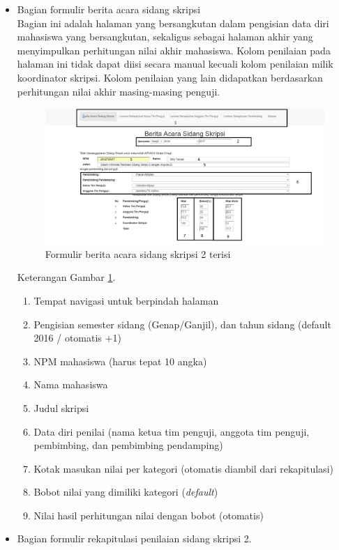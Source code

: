 	\begin{itemize}
		\item Bagian formulir berita acara sidang skripsi\\
		Bagian ini adalah halaman yang bersangkutan dalam pengisian data diri mahasiswa yang bersangkutan, sekaligus sebagai halaman akhir yang menyimpulkan perhitungan nilai akhir mahasiswa. Kolom penilaian pada halaman ini tidak dapat diisi secara manual kecuali kolom penilaian milik koordinator skripsi. Kolom penilaian yang lain didapatkan berdasarkan perhitungan nilai akhir masing-masing penguji.
		\begin{figure}[H]
			\centering
			\includegraphics[scale=0.4]{Gambar/beritaacaraisi}
			\caption{Formulir berita acara sidang skripsi 2 terisi}
			\label{fig:beritaisi}
		\end{figure}
	Keterangan Gambar \ref{fig:beritaisi}.
		\begin{enumerate}
			\item Tempat navigasi untuk berpindah halaman
			\item Pengisian semester sidang (Genap/Ganjil), dan tahun sidang (default 2016 / otomatis +1)
			\item NPM mahasiswa (harus tepat 10 angka)
			\item Nama mahasiswa
			\item Judul skripsi
			\item Data diri penilai (nama ketua tim penguji, anggota tim penguji, pembimbing, dan pembimbing pendamping)
			\item Kotak masukan nilai per kategori (otomatis diambil dari rekapitulasi)
			\item Bobot nilai yang dimiliki kategori (\textit{default})
			\item Nilai hasil perhitungan nilai dengan bobot (otomatis)
		\end{enumerate}
		\item Bagian formulir rekapitulasi penilaian sidang skripsi 2.\\

\end{itemize}
